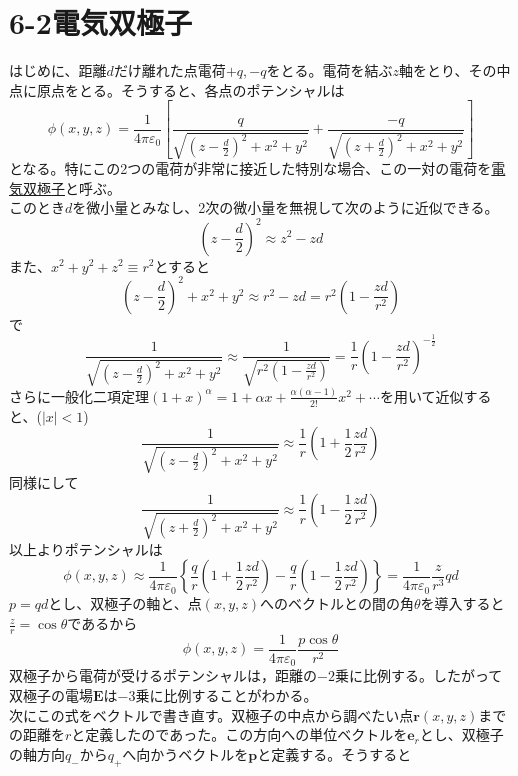 \documentclass{jsarticle}
\begin{document}
\section*{6-2\hspace{5mm}電気双極子}
\noindent
はじめに、距離\(d\)だけ離れた点電荷\(+q,-q\)をとる。電荷を結ぶ\(z\)軸をとり、その中点に原点をとる。そうすると、各点のポテンシャルは
\[\phi(x,y,z)=\frac{1}{4\pi\varepsilon_{0}}\left[\frac{q}{\sqrt{\left(z-\frac{d}{2}\right)^{2}+x^{2}+y^{2}}}+\frac{-q}{\sqrt{\left(z+\frac{d}{2}\right)^{2}+x^{2}+y^{2}}}\right]\]
となる。特にこの2つの電荷が非常に接近した特別な場合、この一対の電荷を\underline{電気双極子}と呼ぶ。\\
このとき\(d\)を微小量とみなし、2次の微小量を無視して次のように近似できる。
\[\left(z-\frac{d}{2}\right)^{2}\approx z^{2}-zd\]
また、\(x^{2}+y^{2}+z^{2}\equiv r^{2}\)とすると
\[\left(z-\frac{d}{2}\right)^{2}+x^{2}+y^{2}\approx r^{2}-zd=r^{2}\left(1-\frac{zd}{r^{2}}\right)\]
で
\[\frac{1}{\sqrt{\left(z-\frac{d}{2}\right)^{2}+x^{2}+y^{2}}}\approx\frac{1}{\sqrt{r^{2}\left(1-\frac{zd}{r^{2}}\right)}}=\frac{1}{r}\left(1-\frac{zd}{r^{2}}\right)^{-\frac{1}{2}}\]
さらに一般化二項定理\(\displaystyle(1+x)^{\alpha}=1+\alpha x+\frac{\alpha(\alpha-1)}{2!}x^{2}+\cdots\)を用いて近似すると、(\(|x|<1\))
\[\frac{1}{\sqrt{\left(z-\frac{d}{2}\right)^{2}+x^{2}+y^{2}}}\approx\frac{1}{r}\left(1+\frac{1}{2}\frac{zd}{r^{2}}\right)\]
同様にして
\[\frac{1}{\sqrt{\left(z+\frac{d}{2}\right)^{2}+x^{2}+y^{2}}}\approx\frac{1}{r}\left(1-\frac{1}{2}\frac{zd}{r^{2}}\right)\]
以上よりポテンシャルは
\begin{equation}
\phi(x,y,z)\approx\frac{1}{4\pi\varepsilon_{0}}\left\{\frac{q}{r}\left(1+\frac{1}{2}\frac{zd}{r^{2}}\right)-\frac{q}{r}\left(1-\frac{1}{2}\frac{zd}{r^{2}}\right)\right\}=\frac{1}{4\pi\varepsilon_{0}}\frac{z}{r^{3}}qd
\end{equation}
\(p=qd\)とし、双極子の軸と、点\((x,y,z)\)へのベクトルとの間の角\(\theta\)を導入すると\(\frac{z}{r}=\cos\theta\)であるから
\begin{equation}
\phi(x,y,z)=\frac{1}{4\pi\varepsilon_{0}}\frac{p\cos\theta}{r^{2}}
\end{equation}
双極子から電荷が受けるポテンシャルは，距離の\(-2\)乗に比例する。したがって双極子の電場\(\bm{E}\)は\(-3\)乗に比例することがわかる。\\
次にこの式をベクトルで書き直す。双極子の中点から調べたい点\(\bm{r}(x,y,z)\)までの距離を\(r\)と定義したのであった。この方向への単位ベクトルを\(\bm{e}_{r}\)とし、双極子の軸方向\(q_{-}\)から\(q_{+}\)へ向かうベクトルを\(\bm{p}\)と定義する。そうすると
\end{document}
